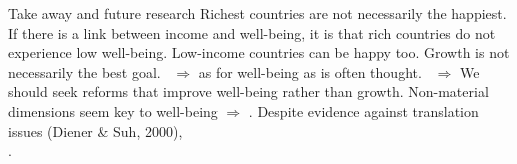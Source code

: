 \documentclass[aspectratio=169,xcolor=dvipsnames, 11pt,mathserif]{beamer}
\begin{document}
\begin{frame}{Take away and future research}
    \bbsp
    \ip {}
    \ip Richest countries are not necessarily the happiest.
    \ip If there is a link between income and well-being, it is that rich countries do not experience low well-being.
    \ip Low-income countries can be happy too. Growth is not necessarily the best goal.
    \ip ~$\Rightarrow$  as  for well-being as is often thought.
    \ip ~$\Rightarrow$ We should seek reforms that improve well-being rather than growth. %
    \ip Non-material dimensions seem key to well-being $\Rightarrow$ . %
    \ip Despite evidence against translation issues (Diener \& Suh, 2000), %
    \\.
    \ee
\end{frame}
\end{document}
